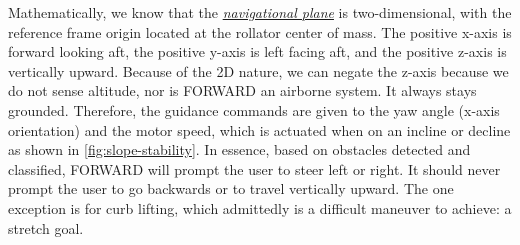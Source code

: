\noindent Mathematically, we know that the \underline{\textit{navigational plane}} is two-dimensional, with the reference frame origin located at the rollator center of mass. The positive x-axis is forward looking aft, the positive y-axis is left facing aft, and the positive z-axis is vertically upward. Because of the 2D nature, we can negate the z-axis because we do not sense altitude, nor is FORWARD an airborne system. It always stays grounded. Therefore, the guidance commands are given to the yaw angle (x-axis orientation) and the motor speed, which is actuated when on an incline or decline as shown in \ref{fig:slope-stability}. In essence, based on obstacles detected and classified, FORWARD will prompt the user to steer left or right. It should never prompt the user to go backwards or to travel vertically upward. The one exception is for curb lifting, which admittedly is a difficult maneuver to achieve: a stretch goal.\\